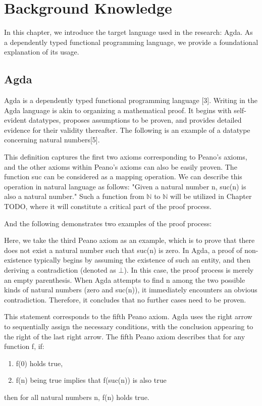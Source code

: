 \chapter{Background Knowledge}
\label{chapter:doccls}

In this chapter, we introduce the target language used in the research: Agda. 
As a dependently typed functional programming language, we provide a foundational explanation of its usage.

\section{Agda}

Agda is a dependently typed functional programming language [3].
Writing in the Agda language is akin to organizing a mathematical proof. It begins with self-evident datatypes, proposes assumptions to be proven, and provides detailed evidence for their validity thereafter.
The following is an example of a datatype concerning natural numbers[5]. 



This definition captures the first two axioms corresponding to Peano's axioms, and the other axioms within Peano's axioms can also be easily proven. 
The function suc can be considered as a mapping operation. 
We can describe this operation in natural language as follows: 
"Given a natural number n, suc(n) is also a natural number." 
Such a function from $\mathbb{N}$ to $\mathbb{N}$ will be utilized in Chapter {TODO}, where it will constitute a critical part of the proof process.

And the following demonstrates two examples of the proof process:



Here, we take the third Peano axiom as an example, which is to prove that there does not exist a natural number such that suc(n) is zero. 
In Agda, a proof of non-existence typically begins by assuming the existence of such an entity, and then deriving a contradiction (denoted as $\bot$). 
In this case, the proof process is merely an empty parenthesis.
When Agda attempts to find n among the two possible kinds of natural numbers (zero and suc(n)), it immediately encounters an obvious contradiction. 
Therefore, it concludes that no further cases need to be proven.


This statement corresponds to the fifth Peano axiom. 
Agda uses the right arrow to sequentially assign the necessary conditions, with the conclusion appearing to the right of the last right arrow. 
The fifth Peano axiom describes that for any function f, if:
\begin{enumerate}[1.]
\item f(0) holds true,
\item f(n) being true implies that f(suc(n)) is also true
\end{enumerate}
then for all natural numbers n, f(n) holds true.

